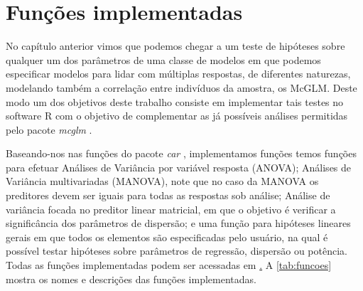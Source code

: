 
\chapter{Funções implementadas}

\label{cap:funcoes}


No capítulo anterior vimos que podemos chegar a um teste de hipóteses sobre qualquer um dos parâmetros de uma classe de modelos em que podemos especificar modelos para lidar com múltiplas respostas, de diferentes naturezas, modelando também a correlação entre indivíduos da amostra, os McGLM. Deste modo um dos objetivos deste trabalho consiste em implementar tais testes no software R \citep{softwareR} com o objetivo de complementar as já possíveis análises permitidas pelo pacote \emph{mcglm} \citep{mcglm}.

Baseando-nos nas funções do pacote \emph{car} \citep{car}, implementamos funções temos funções para efetuar Análises de Variância por variável resposta (ANOVA); Análises de Variância multivariadas (MANOVA), note que no caso da MANOVA os preditores devem ser iguais para todas as respostas sob análise; Análise de variância focada no preditor linear matricial, em que o objetivo é verificar a significância dos parâmetros de dispersão; e uma função para hipóteses lineares gerais em que todos os elementos são especificadas pelo usuário, na qual é possível testar hipóteses sobre parâmetros de regressão, dispersão ou potência. Todas as funções implementadas podem ser acessadas em \href{https://github.com/lineu96/msc/blob/master/3_th_mcglm/0_funcoes/functions.R}. A \autoref{tab:funcoes} mostra os nomes e descrições das funções implementadas.

